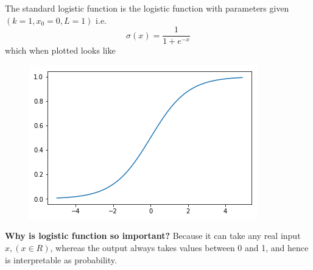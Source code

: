 \documentclass[10pt,a4paper]{article}
\begin{document}
	The standard logistic function is the logistic function with parameters given $(k = 1, x_0 = 0, L = 1)$
	i.e.\\
	\begin{equation}
		\sigma(x) = \frac{1}{1 + e^{-x}}
	\end{equation}
	which when plotted looks like\\
	\begin{figure}[h]
		\includegraphics[scale=0.65]{sigmoidplot}
		\centering
	\end{figure}

	\textbf{Why is logistic function so important?}
	Because it can take any real input $x, (x \in R)$, whereas the output always takes values between 0 and 1, and hence is interpretable as probability.
	

	
\end{document}

